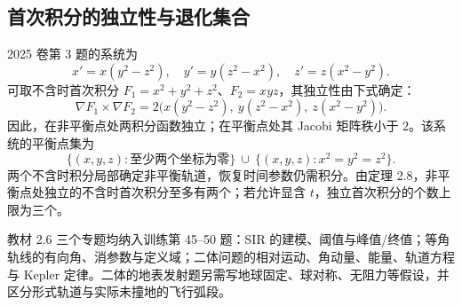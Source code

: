 \subsection*{首次积分的独立性与退化集合}
2025 卷第 3 题的系统为
\[
x'=x(y^2-z^2),\quad y'=y(z^2-x^2),\quad z'=z(x^2-y^2).
\]
可取不含时首次积分 $F_1=x^2+y^2+z^2$、$F_2=xyz$，其独立性由下式确定：
\[
\nabla F_1\times\nabla F_2
=2\bigl(x(y^2-z^2),\ y(z^2-x^2),\ z(x^2-y^2)\bigr).
\]
因此，在非平衡点处两积分函数独立；在平衡点处其 Jacobi 矩阵秩小于 $2$。该系统的平衡点集为
\[
\{(x,y,z):\text{至少两个坐标为零}\}\ \cup\ \{(x,y,z):x^2=y^2=z^2\}.
\]
两个不含时积分局部确定非平衡轨道，恢复时间参数仍需积分。由定理 2.8，非平衡点处独立的不含时首次积分至多有两个；若允许显含 $t$，独立首次积分的个数上限为三个。

教材 2.6 三个专题均纳入训练第 45--50 题：SIR 的建模、阈值与峰值/终值；等角轨线的有向角、消参数与定义域；二体问题的相对运动、角动量、能量、轨道方程与 Kepler 定律。二体的地表发射题另需写地球固定、球对称、无阻力等假设，并区分形式轨道与实际未撞地的飞行弧段。



